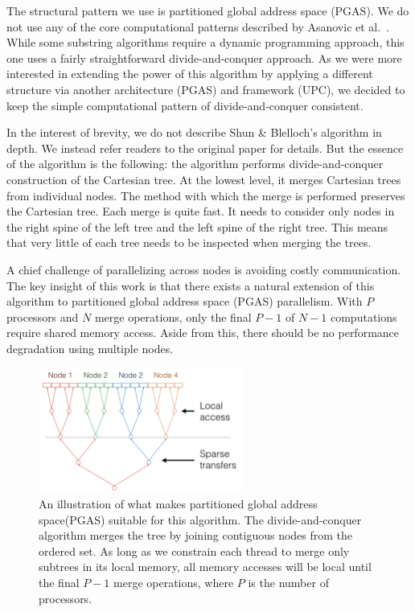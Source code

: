 \documentclass[10pt]{article}
\begin{document}
The structural pattern we use is partitioned global address space (PGAS).
We do not use any of the core computational patterns described by Asanovic et
al.~\cite{asanovic_view_2009}.
While some substring algorithms require a dynamic programming approach, this one uses a fairly
straightforward divide-and-conquer approach.
As we were more interested in extending the power of this algorithm by applying a different
structure via another architecture (PGAS) and framework (UPC), we decided to keep the simple
computational pattern of divide-and-conquer consistent.

In the interest of brevity, we do not describe Shun \& Blelloch's algorithm in depth.
We instead refer readers to the original paper for details.
But the essence of the algorithm is the following:
the algorithm performs divide-and-conquer construction of the Cartesian tree.
At the lowest level, it merges Cartesian trees from individual nodes.
The method with which the merge is performed preserves the Cartesian tree.
Each merge is quite fast.
It needs to consider only nodes in the right spine of the left tree and the left spine of the right tree.
This means that very little of each tree needs to be inspected when merging the trees.

A chief challenge of parallelizing across nodes is avoiding costly communication.
The key insight of this work is that there exists a natural extension of this algorithm to partitioned global address space (PGAS) parallelism.
With $P$ processors and $N$ merge operations, only the final $P - 1$ of $N - 1$ computations require shared memory access.
Aside from this, there should be no performance degradation using multiple nodes.

\begin{figure}
\centering
\includegraphics[width=0.6\textwidth]{figures/architecture}
\caption{%
An illustration of what makes partitioned global address space(PGAS) suitable for this algorithm.
The divide-and-conquer algorithm merges the tree by joining contiguous nodes from the ordered set.
As long as we constrain each thread to merge only subtrees in its local memory, all memory accesses will be local until the final $P - 1$ merge operations, where $P$ is the number of processors.
}
\label{fig:architecture}
\end{figure}
\end{document}
